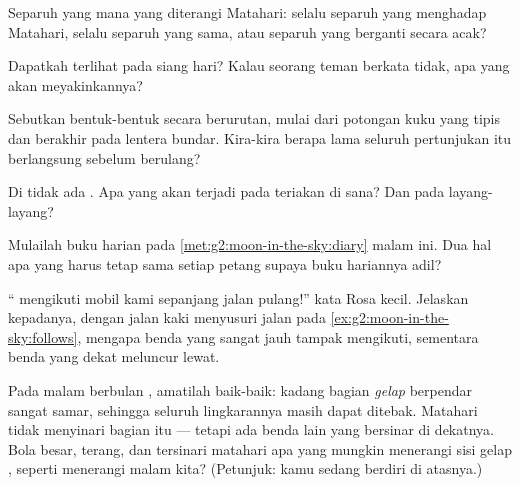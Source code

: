 \begin{exercise}[$\star$]\label{exo:g2:moon-in-the-sky:4}
Separuh  yang mana yang diterangi Matahari: selalu separuh yang
menghadap Matahari, selalu separuh yang sama, atau separuh yang
berganti secara acak?
\end{exercise}

\begin{exercise}[$\star$]\label{exo:g2:moon-in-the-sky:5}
Dapatkah  terlihat pada siang hari? Kalau seorang teman berkata
tidak, apa yang akan meyakinkannya?
\end{exercise}

\begin{exercise}[$\star$]\label{exo:g2:moon-in-the-sky:6}
Sebutkan bentuk-bentuk  secara berurutan, mulai dari potongan
kuku yang tipis dan berakhir pada lentera bundar. Kira-kira berapa
lama seluruh pertunjukan itu berlangsung sebelum berulang?
\end{exercise}

\begin{exercise}[$\star$]\label{exo:g2:moon-in-the-sky:7}
Di  tidak ada . Apa yang akan terjadi pada teriakan di sana?
Dan pada layang-layang?
\end{exercise}

\begin{exercise}[$\star$]\label{exo:g2:moon-in-the-sky:8}
Mulailah buku harian  pada \cref{met:g2:moon-in-the-sky:diary}
malam ini. Dua hal apa yang harus tetap sama setiap petang supaya buku
hariannya adil?
\end{exercise}

\begin{exercise}[$\star\star$]\label{exo:g2:moon-in-the-sky:9}
`` mengikuti mobil kami sepanjang jalan pulang!'' kata Rosa
kecil. Jelaskan kepadanya, dengan jalan kaki menyusuri jalan pada
\cref{ex:g2:moon-in-the-sky:follows}, mengapa benda yang sangat jauh
tampak mengikuti, sementara benda yang dekat meluncur lewat.
\end{exercise}

\begin{exercise}[$\star\star$]\label{exo:g2:moon-in-the-sky:10}
Pada malam berbulan , amatilah baik-baik: kadang bagian
\emph{gelap}  berpendar sangat samar, sehingga seluruh
lingkarannya masih dapat ditebak. Matahari tidak menyinari bagian itu
--- tetapi ada benda lain yang bersinar di dekatnya. Bola besar,
terang, dan tersinari matahari apa yang mungkin menerangi sisi gelap
, seperti  menerangi malam kita? (Petunjuk: kamu sedang
berdiri di atasnya.)
\end{exercise}
